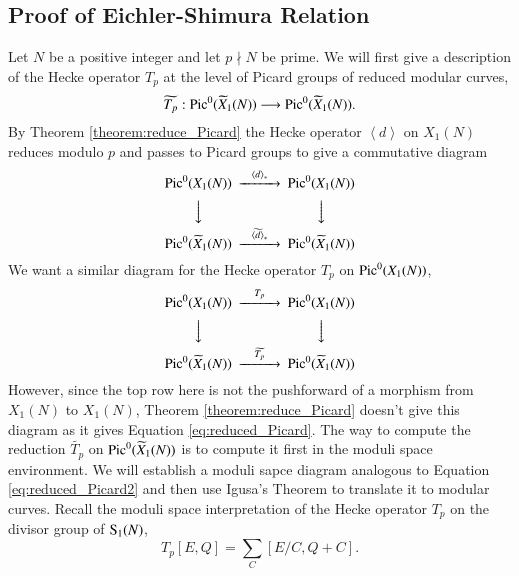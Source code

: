 \subsection{Proof of Eichler-Shimura Relation}

Let $N$ be a positive integer and let $p\nmid N$ be prime. We will first give a description of the Hecke 
operator $T_p$ at the level of Picard groups of reduced modular curves,
\begin{equation*}
    \widetilde{T_p}:{\rm Pic}^0(\widetilde{X}_1(N)) \longrightarrow {\rm Pic}^0(\widetilde{X}_1(N)).
\end{equation*}
By Theorem \ref{theorem:reduce_Picard} the Hecke operator $\left\langle d \right\rangle $ on $X_1(N)$
reduces modulo $p$ and passes to Picard groups to give a commutative diagram 
\begin{equation}
    \begin{CD}
        {\rm Pic}^0(X_1(N)) @>\left\langle d\right\rangle _*>> {\rm Pic}^0(X_1(N)) \\
        @VVV @VVV \\
        {\rm Pic}^0(\widetilde{X}_1(N)) @>\widetilde{\left\langle d \right\rangle}_*>> {\rm Pic}^0(\widetilde{X}_1(N)) 
    \end{CD}
    \label{eq:reduced_Picard}
\end{equation}
We want a similar diagram for the Hecke operator $T_p$ on ${\rm Pic}^0(X_1(N))$, 
\begin{equation}
    \begin{CD}
        {\rm Pic}^0(X_1(N)) @>T_p>> {\rm Pic}^0(X_1(N)) \\
        @VVV @VVV \\
        {\rm Pic}^0(\widetilde{X}_1(N)) @>\widetilde{T_p}>> {\rm Pic}^0(\widetilde{X}_1(N)) 
    \end{CD}
    \label{eq:reduced_Picard2}
\end{equation}
However, since the top row here is not the pushforward of a morphism from $X_1(N)$ to $X_1(N)$, Theorem \ref{theorem:reduce_Picard}
doesn't give this diagram as it gives Equation \ref{eq:reduced_Picard}.
The way to compute the reduction $\widetilde{T_p}$ on ${\rm Pic}^0(\widetilde{X}_1(N))$ is to compute it first
in the moduli space environment. We will establish a moduli sapce diagram analogous to Equation \ref{eq:reduced_Picard2} and then use 
Igusa's Theorem to translate it to modular curves. Recall the moduli space interpretation of the Hecke operator $T_p$
on the divisor group of ${\rm S}_1(N)$,
\begin{equation}
    T_p[E,Q]=\sum_C[E/C,Q+C].
    \label{eq:T_p}
\end{equation}
